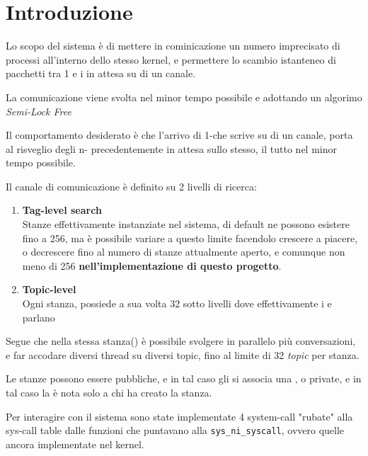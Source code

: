 \section{Introduzione}

Lo scopo del sistema è di mettere in cominicazione un numero imprecisato di processi all'interno dello stesso kernel, e
permettere lo scambio istanteneo di pacchetti tra 1 \Writer e i \Reader in attesa su di un canale.

La comunicazione viene svolta nel minor tempo possibile e adottando un algorimo \textit{Semi-Lock Free}

Il comportamento desiderato è che l'arrivo di 1-\Writer che scrive su di un canale, porta al risveglio degli n-\Reader
precedentemente in attesa sullo stesso, il tutto nel minor tempo possibile.

Il canale di comunicazione è definito su 2 livelli di ricerca:
\begin{enumerate}
    \item \textbf{Tag-level search} \\
    Stanze effettivamente instanziate nel sistema, di default ne possono esistere fino a 256,
    ma è possibile variare a \RunTime questo limite facendolo crescere a piacere, o decrescere fino al
    numero di stanze attualmente aperto, e comunque non meno di 256 \textbf{nell'implementazione di questo progetto}.
    \item \textbf{Topic-level} \\
    Ogni stanza, possiede a sua volta 32 sotto livelli dove effettivamente i \Reader  e \Writer  parlano
\end{enumerate}

Segue che nella stessa stanza(\tagSys) è possibile svolgere in parallelo più conversazioni, e far accodare
diversi thread su diversi topic, fino al limite di 32 \textit{topic} per stanza.

Le stanze possono essere pubbliche, e in tal caso gli si associa una \keySys, o private, e in tal caso la \tagSys è
nota solo a chi ha creato la stanza.

Per interagire con il sistema sono state implementate 4 system-call "rubate" alla sys-call table dalle funzioni che
puntavano alla \verb|sys_ni_syscall|, ovvero quelle ancora implementate nel kernel.

